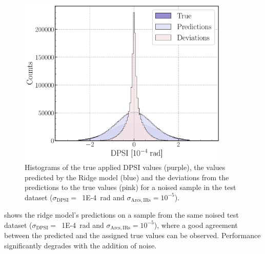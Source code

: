 \begin{figure}[!htb]
    \centering
    \includegraphics*[width=0.9\textwidth]{Figures/ML_for_IR_Coupling/ridge_histograms.pdf}
    \caption{Histograms of the true applied \(\mathrm{DPSI}\) values (\textcolor{ridgepurple}{purple}), the values predicted by the Ridge model (\textcolor{ridgeblue}{blue}) and the deviations from the predictions to the true values (\textcolor{ridgesalmon}{pink}) for a noised sample in the test dataset (\(\sigma_{\mathrm{DPSI}} =\)~\qty{1E-4}{\radian} and \(\sigma_{\mathrm{Arcs, IRs}} = 10^{-5}\)).}
    \label{figure:ridge_histograms}
\end{figure}

 shows the ridge model's predictions on a sample from the same noised test dataset (\(\sigma_{\mathrm{DPSI}} =\)~\qty{1E-4}{\radian} and \(\sigma_{\mathrm{Arcs, IRs}} = 10^{-5}\)), where a good agreement between the predicted and the assigned true values can be observed.
Performance significantly degrades with the addition of noise.

